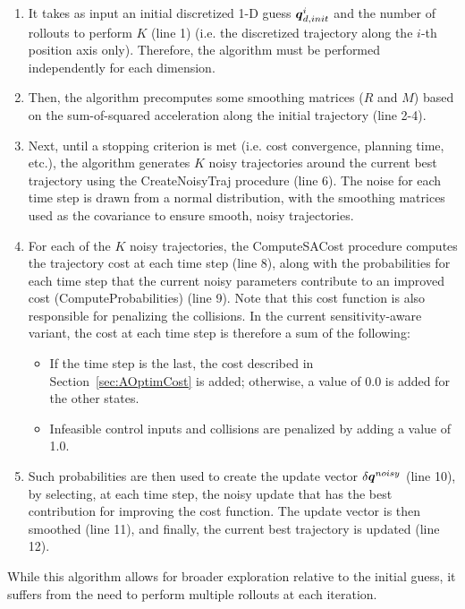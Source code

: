 \begin{enumerate}
    \item It takes as input an initial discretized 1-D guess $\boldsymbol{q}_{d,init}^{i}$ and the number of rollouts to perform $K$ (line 1) (i.e. the discretized trajectory along the $i$-th position axis only). 
    Therefore, the algorithm must be performed independently for each dimension. 
    \item Then, the algorithm precomputes some smoothing matrices ($R$ and $M$) based on the sum-of-squared acceleration along the initial trajectory (line 2-4).
    \item Next, until a stopping criterion is met (i.e. cost convergence, planning time, etc.), the algorithm generates $K$ noisy trajectories around the current best trajectory using the CreateNoisyTraj procedure (line 6).
    The noise for each time step is drawn from a normal distribution, with the smoothing matrices used as the covariance to ensure smooth, noisy trajectories.
    \item For each of the $K$ noisy trajectories, the ComputeSACost procedure computes the trajectory cost at each time step (line 8), along with the probabilities for each time step that the current noisy parameters contribute to an improved cost (ComputeProbabilities) (line 9).
    Note that this cost function is also responsible for penalizing the collisions.
    In the current sensitivity-aware variant, the cost at each time step is therefore a sum of the following:
    \begin{itemize}
        \item If the time step is the last, the cost described in Section~\ref{sec:AOptimCost} is added; otherwise, a value of 0.0 is added for the other states.
        \item Infeasible control inputs and collisions are penalized by adding a value of 1.0.
    \end{itemize}
    \item Such probabilities are then used to create the update vector $\delta \boldsymbol{q}^{noisy}$ (line 10), by selecting, at each time step, the noisy update that has the best contribution for improving the cost function.
    The update vector is then smoothed (line 11), and finally, the current best trajectory is updated (line 12).
\end{enumerate}

While this algorithm allows for broader exploration relative to the initial guess, it suffers from the need to perform multiple rollouts at each iteration.


